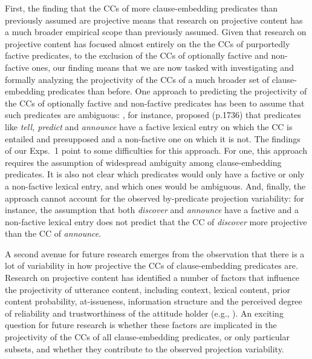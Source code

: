 \documentclass[11pt,fleqn]{article}
\newcommand{\6}{\mbox{$[\hspace*{-.6mm}[$}}
\newcommand{\9}{\mbox{$]\hspace*{-.6mm}]$}}
\begin{document}
{First, the finding that the CCs of more clause-embedding predicates than previously assumed are projective means that research on projective content has a much broader empirical scope than previously assumed. Given that research on projective content has focused almost entirely on the the CCs of purportedly factive predicates, to the exclusion of the CCs of optionally factive and non-factive ones, our finding means that we are now tasked with investigating and formally analyzing the projectivity of the CCs of a much broader set of clause-embedding predicates than before. One approach to predicting the projectivity of the CCs of optionally factive and non-factive predicates has been to assume that such predicates are ambiguous: \citet{spector-egre2015}, for instance, proposed (p.1736) that predicates like {\em tell, predict} and {\em announce}  have a factive lexical entry on which the CC is entailed and presupposed and a non-factive one on which it is not. The findings of our Exps.~1 point to some difficulties for this approach. For one, this approach requires the assumption of widespread ambiguity among clause-embedding predicates. It is also not clear which predicates would only have a factive or only a non-factive lexical entry, and which ones would be ambiguous. And, finally, the approach cannot account for the observed by-predicate projection variability: for instance, the assumption that both {\em discover} and {\em announce} have a factive and a non-factive lexical entry does not predict that the CC of {\em discover} more projective than the CC of {\em announce}. 

A second avenue for future research emerges from the observation that there is a lot of variability in how projective the CCs of clause-embedding predicates are. Research on projective content has identified a number of factors that influence the projectivity of utterance content, including context, lexical content, prior content probability, at-issueness, information structure and the perceived degree of reliability and trustworthiness of the attitude holder (e.g., \citealt{gazdar79a,gazdar79b,beaver-belly,schlenker10,brst-salt10,best-question,abrusan2011,abrusan2016,anand-hacquard2014,cummins-rohde2015,djaerv-bacovcin-salt27,tonhauser-salt26,tonhauser-guarani-variability,tbd-variability,tonhauser-etal-sub23}). An exciting question for future research is whether these factors are implicated in the projectivity of the CCs of all clause-embedding predicates, or only particular subsets, and whether they contribute to the observed projection variability. 

}
\end{document}
